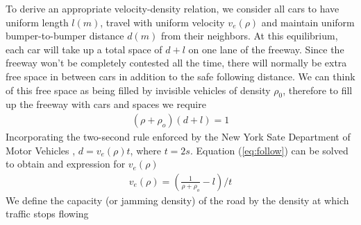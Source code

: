 	To derive an appropriate velocity-density relation, we consider all cars to have uniform length $l(m)$, travel with uniform velocity $v_e(\rho)$ and maintain uniform bumper-to-bumper distance $d(m)$ from their neighbors. At this equilibrium, each car will take up a total space of $d+l$ on one lane of the freeway. Since the freeway won't be completely contested all the time, there will normally be extra free space in between cars in addition to the safe following distance. We can think of this free space as being filled by invisible vehicles of density $\rho_0$, therefore to fill up the freeway with cars and spaces we require
	\begin{align}
	& (\rho + \rho_o)(d+l) = 1 & \label{eq:follow}
	\end{align}
	Incorporating the two-second rule enforced by the New York Sate Department of Motor Vehicles \cite{two_second}, $d=v_e(\rho)t$, where $t=2s$. Equation (\ref{eq:follow}) can be solved to obtain and expression for $v_e(\rho)$
	\begin{align}
	& v_e(\rho) =  (\frac{1}{\rho+\rho_o}-l)/t& 
	\end{align}
	We define the capacity (or jamming density) of the road by the density at which traffic stops flowing

